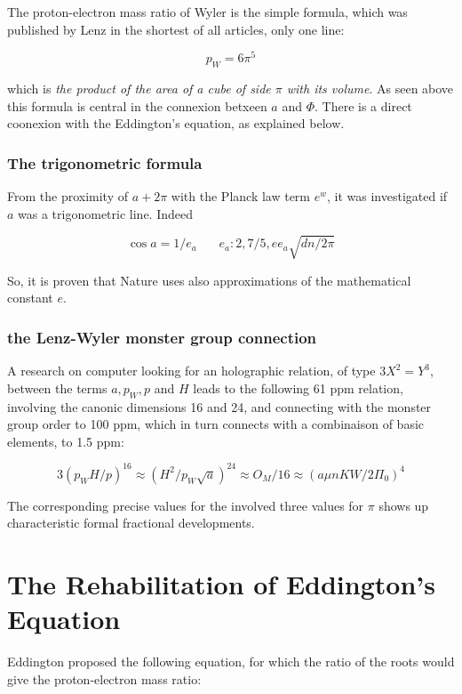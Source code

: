 \documentclass[a4paper,9pt]{article}
\begin{document}
The proton-electron mass ratio of Wyler \cite{Wyler} is the simple formula, which was published by Lenz in the shortest of all articles, only one line: 

\begin{equation}
 p_W = 6\pi^5    
\end{equation}

which is \textit {the product of the area of a cube of side $\pi$ with its volume}. As seen above this formula is central in the connexion betxeen $a$ and $\Phi$. There is a direct coonexion with the Eddington's equation, as explained below. 



\subsubsection {The trigonometric formula}
From the proximity of $a + 2\pi$ with the Planck law term $e^w$, it was investigated if $a$ was a trigonometric line. Indeed 
 
\begin{equation}
\cos{a} = 1/e_a ~~~~~~~~  e_a : 2, 7/5, ee_a \sqrt{dn/2\pi} 
\end{equation}

So, it is proven that Nature uses also approximations of the mathematical constant $e$.


\subsubsection {the Lenz-Wyler monster group connection}

A research on computer looking for an holographic relation, of type $3X^2 = Y^3$, between the terms $a, p_W, p$ and $H$ leads to the following 61 ppm relation, involving the canonic dimensions 16 and 24, and connecting with the monster group order to 100 ppm, which in turn connects with a combinaison of basic elements, to 1.5 ppm:

\begin{equation}
3 (p_W H/p)^{16} \approx (H^2/p_W \sqrt a )^{24} \approx O_M / 16 \approx (a \mu n K W/2 \Pi_0)^4
\end{equation}

The corresponding precise values for the involved three values for $\pi$ shows up characteristic formal fractional developments. 





\section{The Rehabilitation of Eddington's Equation}
Eddington proposed the following equation, for which the ratio of the roots would give the proton-electron mass ratio:
\end{document}
